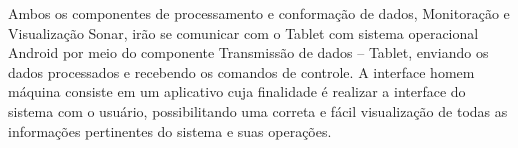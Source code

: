 Ambos os componentes de processamento e conformação de dados, Monitoração e
Visualização Sonar, irão se comunicar com o Tablet com sistema operacional
Android por meio do componente Transmissão de dados – Tablet, enviando os dados
processados e recebendo os comandos de controle.  A interface homem máquina
consiste em um aplicativo cuja finalidade é realizar a interface do sistema com
o usuário, possibilitando uma correta e fácil visualização de todas as
informações pertinentes do sistema e suas operações.
